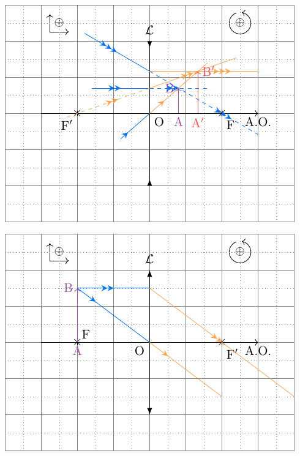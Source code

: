 \documentclass[../../main/main.tex]{subfiles}
\begin{document}
\begin{tcb}[label=impo:cons_exem]
\begin{minipage}{0.50\linewidth}
\begin{center}
			\label{fig:corrconvconstruafter}
		\end{center}
	\end{minipage}
	\begin{minipage}{0.50\linewidth}
		\begin{center}
			\includegraphics[width=\linewidth]{lent_div-constru_after_a}
			\label{fig:corrdivconstruafter}
		\end{center}
	\end{minipage}
	\hfill
	\begin{minipage}{0.50\linewidth}
		\begin{center}
			\includegraphics[width=\linewidth]{lent_conv-constru_F}
			\label{fig:corrconvconstruF}
		\end{center}
	\end{minipage}
\end{tcb}
\end{document}
